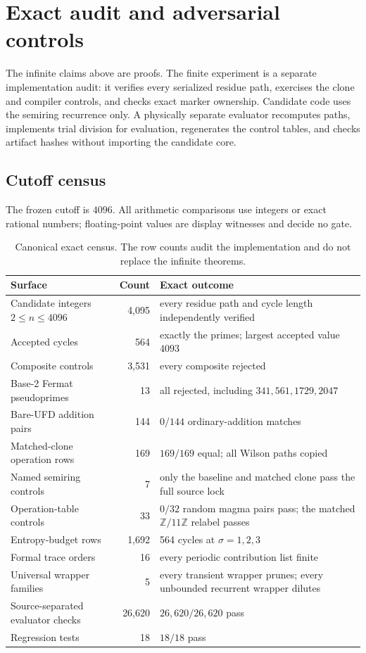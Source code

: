 \section{Exact audit and adversarial controls}
\label{sec:exact-audit}

The infinite claims above are proofs.  The finite experiment is a separate
implementation audit: it verifies every serialized residue path, exercises
the clone and compiler controls, and checks exact marker ownership.  Candidate
code uses the semiring recurrence only.  A physically separate evaluator
recomputes paths, implements trial division for evaluation, regenerates the
control tables, and checks artifact hashes without importing the candidate
core.

\subsection{Cutoff census}

The frozen cutoff is $4096$.  All arithmetic comparisons use integers or
exact rational numbers; floating-point values are display witnesses and
decide no gate.

\begin{table}[H]
\centering
\caption{Canonical exact census.  The row counts audit the implementation and
do not replace the infinite theorems.}
\label{tab:exact-census}
\small
\begin{tabularx}{\textwidth}{@{}L{47mm}rY@{}}
\toprule
Surface & Count & Exact outcome \\
\midrule
Candidate integers $2\leq n\leq4096$ & 4,095 & every residue path and cycle length independently verified \\
Accepted cycles & 564 & exactly the primes; largest accepted value $4093$ \\
Composite controls & 3,531 & every composite rejected \\
Base-2 Fermat pseudoprimes & 13 & all rejected, including $341,561,1729,2047$ \\
Bare-UFD addition pairs & 144 & $0/144$ ordinary-addition matches \\
Matched-clone operation rows & 169 & $169/169$ equal; all Wilson paths copied \\
Named semiring controls & 7 & only the baseline and matched clone pass the full source lock \\
Operation-table controls & 33 & $0/32$ random magma pairs pass; the matched $\mathbb Z/11\mathbb Z$ relabel passes \\
Entropy-budget rows & 1,692 & 564 cycles at $\sigma=1,2,3$ \\
Formal trace orders & 16 & every periodic contribution list finite \\
Universal wrapper families & 5 & every transient wrapper prunes; every unbounded recurrent wrapper dilutes \\
Source-separated evaluator checks & 26,620 & $26{,}620/26{,}620$ pass \\
Regression tests & 18 & $18/18$ pass \\
\bottomrule
\end{tabularx}
\end{table}

